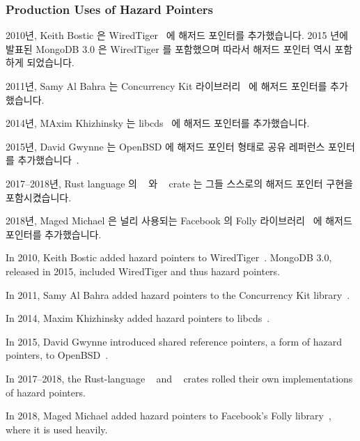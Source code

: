\fi

\subsubsection{Production Uses of Hazard Pointers}
\label{sec:defer:Production Uses of Hazard Pointers}

2010년, Keith Bostic 은
WiredTiger~\cite{KeithBostic2010WiredTigerhazptr} 에 해저드 포인터를
추가했습니다.
2015 년에 발표된 MongoDB 3.0 은 WiredTiger 를 포함했으며 따라서 해저드 포인터
역시 포함하게 되었습니다.

2011년, Samy Al Bahra 는 Concurrency Kit 라이브러리~\cite{SamyAlBahra2011ckhp}
에 해저드 포인터를 추가했습니다.

2014년, MAxim Khizhinsky 는 libcds~\cite{MaximKhizhinsky2014libcdsHazptr} 에
해저드 포인터를 추가했습니다.

2015년, David Gwynne 는 OpenBSD 에 해저드 포인터 형태로 공유 레퍼런스 포인터를
추가했습니다~\cite{DavidGwynne2015srp}.

2017--2018년, Rust language 의
~\cite{MichalVaner2018arc-swapHazptr} 와
~\cite{crates.io.user.ticki2017concHazptr} crate 는 그들 스스로의
해저드 포인터 구현을 포함시켰습니다.

2018년, Maged Michael 은 널리 사용되는 Facebook 의 Folly
라이브러리~\cite{MagedMichael2018FollyHazptr} 에 해저드 포인터를 추가했습니다.

\iffalse

In 2010, Keith Bostic added hazard pointers to
WiredTiger~\cite{KeithBostic2010WiredTigerhazptr}.
MongoDB 3.0, released in 2015, included WiredTiger and thus hazard pointers.

In 2011, Samy Al Bahra added hazard pointers to the Concurrency Kit
library~\cite{SamyAlBahra2011ckhp}.

In 2014, Maxim Khizhinsky added hazard pointers to
libcds~\cite{MaximKhizhinsky2014libcdsHazptr}.

In 2015, David Gwynne introduced shared reference pointers, a form
of hazard pointers, to OpenBSD~\cite{DavidGwynne2015srp}.

In 2017--2018, the Rust-language
~\cite{MichalVaner2018arc-swapHazptr} and
~\cite{crates.io.user.ticki2017concHazptr}
crates rolled their own implementations of hazard pointers.

In 2018, Maged Michael added hazard pointers to Facebook's Folly
library~\cite{MagedMichael2018FollyHazptr}, where it is used heavily.

